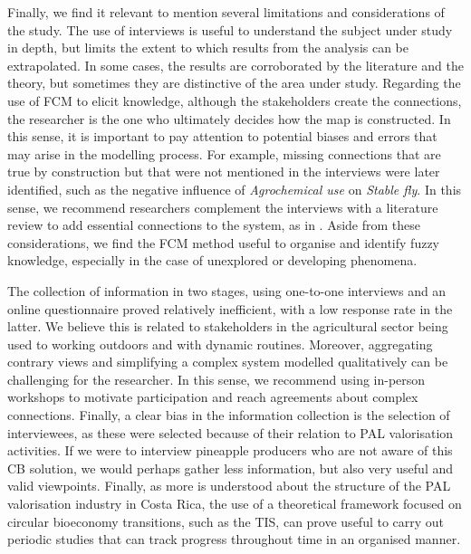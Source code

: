 Finally, we find it relevant to mention several limitations and considerations of the study. The use of interviews is useful to understand the subject under study in depth, but limits the extent to which results from the analysis can be extrapolated. In some cases, the results are corroborated by the literature and the theory, but sometimes they are distinctive of the area under study. Regarding the use of FCM to elicit knowledge, although the stakeholders create the connections, the researcher is the one who ultimately decides how the map is constructed. In this sense, it is important to pay attention to potential biases and errors that may arise in the modelling process. For example, missing connections that are true by construction but that were not mentioned in the interviews were later identified, such as the negative influence of \textit{Agrochemical use} on \textit{Stable fly}. In this sense, we recommend researchers complement the interviews with a literature review to add essential connections to the system, as in \cite{edwards2021building}. Aside from these considerations, we find the FCM method useful to organise and identify fuzzy knowledge, especially in the case of unexplored or developing phenomena.

The collection of information in two stages, using one-to-one interviews and an online questionnaire proved relatively inefficient, with a low response rate in the latter. We believe this is related to stakeholders in the agricultural sector being used to working outdoors and with dynamic routines. Moreover, aggregating contrary views and simplifying a complex system modelled qualitatively can be challenging for the researcher. In this sense, we recommend using in-person workshops to motivate participation and reach agreements about complex connections. Finally, a clear bias in the information collection is the selection of interviewees, as these were selected because of their relation to PAL valorisation activities. If we were to interview pineapple producers who are not aware of this CB solution, we would perhaps gather less information, but also very useful and valid viewpoints. Finally, as more is understood about the structure of the PAL valorisation industry in Costa Rica, the use of a theoretical framework focused on circular bioeconomy transitions, such as the TIS, can prove useful to carry out periodic studies that can track progress throughout time in an organised manner. 
